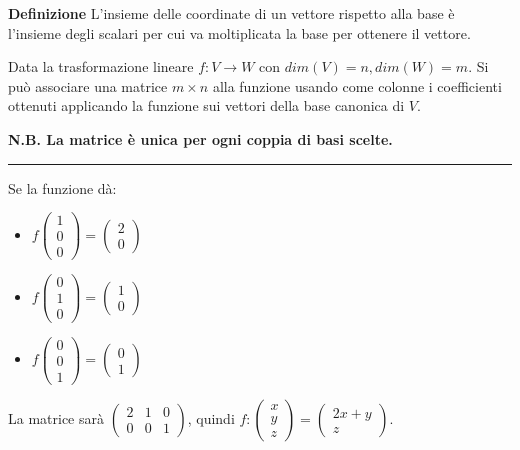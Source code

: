 \documentclass{article}
\begin{document}
\textbf{Definizione} L'insieme delle coordinate di un vettore rispetto alla base è l'insieme degli scalari per cui va moltiplicata la base per ottenere il vettore.\newline

\noindent Data la trasformazione lineare $f:V\rightarrow W$ con $dim(V)=n,dim(W)=m$. Si può associare una matrice $m\times n$ alla funzione usando come colonne i coefficienti ottenuti applicando la funzione sui vettori della base canonica di $V$.

\noindent \textbf{N.B. La matrice è unica per ogni coppia di basi scelte.}\newline

\noindent\rule{\textwidth}{0.5pt}

\noindent Se la funzione dà:
\begin{itemize}
    \item $f\begin{pmatrix}
        1\\0\\0
    \end{pmatrix}=\begin{pmatrix}
        2\\0
    \end{pmatrix}$
    
    \item $f\begin{pmatrix}
        0\\1\\0
    \end{pmatrix}=\begin{pmatrix}
        1\\0
    \end{pmatrix}$
    
    \item $f\begin{pmatrix}
        0\\0\\1
    \end{pmatrix}=\begin{pmatrix}
        0\\1
    \end{pmatrix}$
\end{itemize}

\noindent La matrice sarà $\begin{pmatrix}
    2&1&0\\0&0&1
\end{pmatrix}$, quindi $f:\begin{pmatrix}
    x\\y\\z
\end{pmatrix}=\begin{pmatrix}
    2x+y\\z
\end{pmatrix}$.
\end{document}
